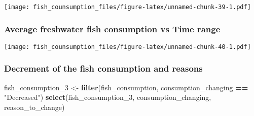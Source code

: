 \documentclass[
]{article}
\newenvironment{Shaded}{\begin{snugshade}}{\end{snugshade}}
\newcommand{\AttributeTok}[1]{\textcolor[rgb]{0.13,0.29,0.53}{#1}}
\newcommand{\FunctionTok}[1]{\textcolor[rgb]{0.13,0.29,0.53}{\textbf{#1}}}
\newcommand{\NormalTok}[1]{#1}
\newcommand{\OtherTok}[1]{\textcolor[rgb]{0.56,0.35,0.01}{#1}}
\newcommand{\SpecialCharTok}[1]{\textcolor[rgb]{0.81,0.36,0.00}{\textbf{#1}}}
\newcommand{\StringTok}[1]{\textcolor[rgb]{0.31,0.60,0.02}{#1}}
\begin{document}
\texttt{[image: fish\_counsumption\_files/figure-latex/unnamed-chunk-39-1.pdf]}

\hypertarget{average-freshwater-fish-consumption-vs-time-range-1}{%
\subsubsection{Average freshwater fish consumption vs Time
range}\label{average-freshwater-fish-consumption-vs-time-range-1}}

\begin{Shaded}
\end{Shaded}

\texttt{[image: fish\_counsumption\_files/figure-latex/unnamed-chunk-40-1.pdf]}

\hypertarget{decrement-of-the-fish-consumption-and-reasons}{%
\subsubsection{Decrement of the fish consumption and
reasons}\label{decrement-of-the-fish-consumption-and-reasons}}

\begin{Shaded}
\begin{Highlighting}[]
\NormalTok{fish\_consumption\_3 }\OtherTok{\textless{}{-}} \FunctionTok{filter}\NormalTok{(fish\_consumption, consumption\_changing }\SpecialCharTok{==} \StringTok{"Decreased"}\NormalTok{)}
                         \FunctionTok{select}\NormalTok{(fish\_consumption\_3, consumption\_changing, reason\_to\_change)}
\end{Highlighting}
\end{Shaded}
\end{document}
